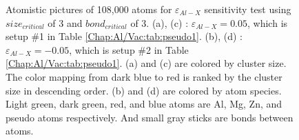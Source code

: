 \begin{figure}[!ht]
\caption[Atomistic pictures of 108,000 atoms for $\varepsilon_{Al-X}$ sensitivity test.]{Atomistic pictures of 108,000 atoms for $\varepsilon_{Al-X}$ sensitivity test using $size_{critical}$ of 3 and $bond_{critical}$ of 3. (a), (c) : $\varepsilon_{Al-X} = 0.05$, which is setup \#1 in Table \ref{Chap:Al/Vac:tab:pseudo1}. (b), (d) : $\varepsilon_{Al-X} = -0.05$, which is setup \#2 in Table \ref{Chap:Al/Vac:tab:pseudo1}. (a) and (c) are colored by cluster size. The color mapping from dark blue to red is ranked by the cluster size in descending order. (b) and (d) are colored by atom species. Light green, dark green, red, and blue atoms are Al, Mg, Zn, and pseudo atoms respectively. And small gray sticks are bonds between atoms.}
\label{Chap:Al/Vac:fig:sens_Al}
\end{figure}
\endgroup


